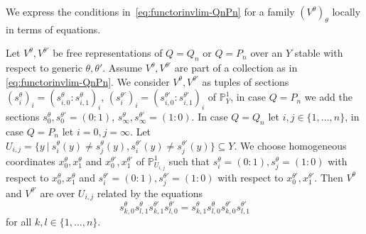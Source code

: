 \documentclass[ALCO,ThmDefs,Unicode,epreuves]{cedram}
\def\P{\mathds P}
\begin{document}
We express the conditions in~\eqref{eq:functorinvlim-QnPn} for a family 
$(V^\theta)_\theta$ locally in terms of equations.

\begin{lemma}\label{le:eq-invlimit}
Let $V^\theta,V^{\theta'}$ be free representations of $Q=Q_n$ or $Q=P_n$ over an %
{} $Y$ stable with respect to generic $\theta,\theta'$. 
Assume $V^\theta,V^{\theta'}$ are part of a collection as in 
\eqref{eq:functorinvlim-QnPn}. 
We consider $V^\theta,V^{\theta'}$ as tuples of sections 
$(s^\theta_i)_i=(s^\theta_{i,0}:s^\theta_{i,1})_i$, 
$(s^{\theta'}_i)_i=(s^{\theta'}_{i,0}:s^{\theta'}_{i,1})_i$ of $\P^1_Y$, 
in case $Q=P_n$ we add the sections $s^\theta_0,s^{\theta'}_0=(0:1)$,
$s^\theta_\infty,s^{\theta'}_\infty=(1:0)$.
In case $Q=Q_n$ let $i,j\in\{1,\ldots,n\}$, in case $Q=P_n$ let $i=0,j=\infty$.
Let $U_{i,j}=\{y\:|\:s^\theta_i(y)\neq s^\theta_j(y),
s^{\theta'}_i(y)\neq s^{\theta'}_j(y)\}\subseteq Y$.
We choose homogeneous coordinates $x^\theta_0,x^\theta_1$ and 
$x^{\theta'}_0,x^{\theta'}_1$ of $\P^1_{U_{i,j}}$ 
such that $s^\theta_i=(0:1),s^\theta_j=(1:0)$ with respect to $x^\theta_0,x^\theta_1$
and $s^{\theta'}_i=(0:1), s^{\theta'}_j=(1:0)$ with respect to $x^{\theta'}_0,x^{\theta'}_1$. 
Then $V^\theta$ and $V^{\theta'}$ are over $U_{i,j}$ related by the equations
\begin{equation}\label{eq:theta-theta'}
s^\theta_{k,0}s^\theta_{l,1}s^{\theta'}_{k,1}s^{\theta'}_{l,0}
=s^\theta_{k,1}s^\theta_{l,0}s^{\theta'}_{k,0}s^{\theta'}_{l,1}
\end{equation}
for all $k,l\in\{1,\ldots,n\}$.
\end{lemma}
\end{document}
